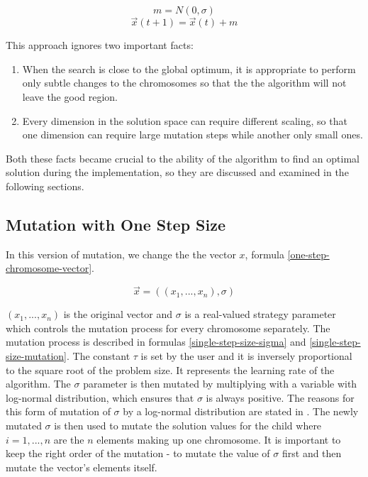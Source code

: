 \begin{equation}
    m = N(0, \sigma)
\end{equation}
\begin{equation} \label{simple-mutation}
    \vec{x}(t+1) = \vec{x}(t) + m
\end{equation}

This approach ignores two important facts:
\begin{enumerate}
    \item When the search is close to the global optimum, it is appropriate to perform only subtle changes to the chromosomes so that the the algorithm will not leave the good region.
    \item Every dimension in the solution space can require different scaling, so that one dimension can require large mutation steps while another only small ones.
\end{enumerate}

Both these facts became crucial to the ability of the algorithm to find an optimal solution during the implementation, so they are discussed and examined in the following sections.

\subsection{Mutation with One Step Size}
In this version of mutation, we change the the vector $x$, formula \ref{one-step-chromosome-vector}.

\begin{equation} \label{one-step-chromosome-vector}
\vec{x} = ((x_1,...,x_n),\sigma)
\end{equation}

 $(x_1,...,x_n)$ is the original vector and $\sigma$ is a real-valued strategy parameter which controls the mutation process for every chromosome separately. The mutation process is described in formulas \ref{single-step-size-sigma} and \ref{single-step-size-mutation}. The constant $\tau$ is set by the user and it is inversely proportional to the square root of the problem size. It represents the learning rate of the algorithm. The $\sigma$ parameter is then mutated by multiplying with a variable with log-normal distribution, which ensures that $\sigma$ is always positive. The reasons for this form of mutation of $\sigma$ by a log-normal distribution are stated in \cite{x}. The newly mutated $\sigma$ is then used to mutate the solution values for the child where $i = 1,...,n$ are the $n$ elements making up one chromosome. It is important to keep the right order of the mutation - to mutate the value of $\sigma$ first and then mutate the vector's elements itself.

